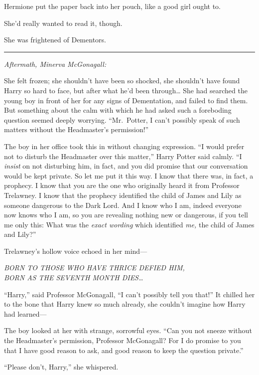 Hermione put the paper back into her pouch, like a good girl ought to.

She'd really wanted to read it, though.

She was frightened of Dementors.

\begin{center}\rule{3in}{0.4pt}\end{center}

\emph{Aftermath, Minerva McGonagall:}

She felt frozen; she shouldn't have been so shocked, she shouldn't have
found Harry so hard to face, but after what he'd been through\ldots{}
She had searched the young boy in front of her for any signs of
Dementation, and failed to find them. But something about the calm with
which he had asked such a foreboding question seemed deeply worrying.
``Mr.~Potter, I can't possibly speak of such matters without the
Headmaster's permission!''

The boy in her office took this in without changing expression. ``I
would prefer not to disturb the Headmaster over this matter,'' Harry
Potter said calmly. ``I \emph{insist} on not disturbing him, in fact,
and you did promise that our conversation would be kept private. So let
me put it this way. I know that there was, in fact, a prophecy. I know
that you are the one who originally heard it from Professor Trelawney. I
know that the prophecy identified the child of James and Lily as someone
dangerous to the Dark Lord. And I know who I am, indeed everyone now
knows who I am, so you are revealing nothing new or dangerous, if you
tell me only this: What was the \emph{exact wording} which identified
\emph{me,} the child of James and Lily?''

Trelawney's hollow voice echoed in her mind---

\emph{BORN TO THOSE WHO HAVE THRICE DEFIED HIM,}\\\emph{BORN AS THE
SEVENTH MONTH DIES\ldots{}}

``Harry,'' said Professor McGonagall, ``I can't possibly tell you
that!'' It chilled her to the bone that Harry knew so much already, she
couldn't imagine how Harry had learned---

The boy looked at her with strange, sorrowful eyes. ``Can you not sneeze
without the Headmaster's permission, Professor McGonagall? For I do
promise to you that I have good reason to ask, and good reason to keep
the question private.''

``Please don't, Harry,'' she whispered.

